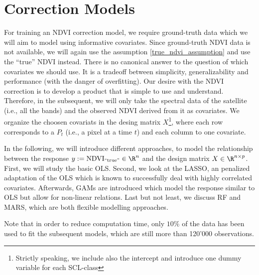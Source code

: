 \section{Correction Models}{
        \label{sec:corr_data_table}
        \label{sec:corr_methods}

    For training an NDVI correction model, we require ground-truth data which we will aim to model using informative covariates. Since ground-truth NDVI data is not available, we will again use the assumption \ref{true_ndvi_assumption} and use the ``true'' NDVI instead. There is no canonical answer to the question of which covariates we should use. It is a tradeoff between simplicity, generalizability and performance (with the danger of overfitting). 
    Our desire with the NDVI correction is to develop a product that is simple to use and understand. Therefore, in the subsequent, we will only take the spectral data of the satellite (i.e., all the bands) and the observed NDVI derived from it as covariates. We organize the choosen covariats in the desing matrix $X$\footnote{Strictly speaking, we include also the intercept and introduce one dummy variable for each SCL-class}, where each row corresponds to a $P_t$ (i.e., a pixel at a time $t$) and each column to one covariate.    

    In the following, we will introduce different approaches, to model the relationship between the response $y:=\operatorname{NDVI}_\text{``true''}\in \R^n$ and the design matrix $X\in\R^{n \times p}$. First, we will study the basic OLS. Second, we look at the LASSO, an penalized adaptation of the OLS which is known to successfully deal with highly correlated covariates. Afterwards, GAMs are introduced which model the response similar to OLS but allow for non-linear relations. Last but not least, we discuss RF and MARS, which are both flexible modelling approaches. %

    Note that in order to reduce computation time, only $10\%$ of the data has been used to fit the subsequent models, which are still more than 120'000 observations. 
    
    
}

